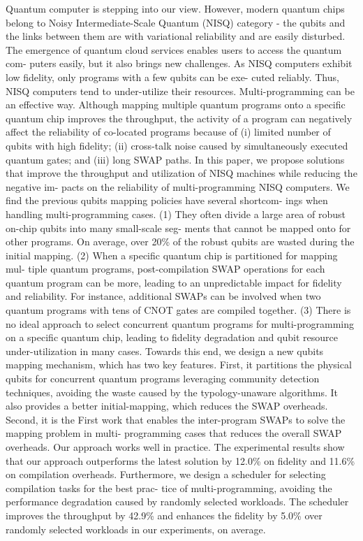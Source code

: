 \documentclass{article}
\begin{document}
	Quantum computer is stepping into our view. However, modern
	quantum chips belong to Noisy Intermediate-Scale Quantum (NISQ)
	category \cite{preskill2018quantum} - the qubits and the links between them are with
	variational reliability and are easily disturbed. The emergence of
	quantum cloud services enables users to access the quantum com-
	puters easily, but it also brings new challenges. As NISQ computers
	exhibit low fidelity, only programs with a few qubits can be exe-
	cuted reliably. Thus, NISQ computers tend to under-utilize their
	resources. Multi-programming can be an effective way. Although
	mapping multiple quantum programs onto a specific quantum chip
	improves the throughput, the activity of a program can negatively
	affect the reliability of co-located programs because of (i) limited
	number of qubits with high fidelity; (ii) cross-talk noise caused by
	simultaneously executed quantum gates; and (iii) long SWAP paths.
	In this paper, we propose solutions that improve the throughput
	and utilization of NISQ machines while reducing the negative im-
	pacts on the reliability of multi-programming NISQ computers. We
	find the previous qubits mapping policies have several shortcom-
	ings when handling multi-programming cases. (1) They often divide a large area of robust on-chip qubits into many small-scale seg-
	ments that cannot be mapped onto for other programs. On average,
	over 20\% of the robust qubits are wasted during the initial mapping.
	(2) When a specific quantum chip is partitioned for mapping mul-
	tiple quantum programs, post-compilation SWAP operations for
	each quantum program can be more, leading to an unpredictable
	impact for fidelity and reliability. For instance, additional SWAPs
	can be involved when two quantum programs with tens of CNOT
	gates are compiled together. (3) There is no ideal approach to select
	concurrent quantum programs for multi-programming on a specific
	quantum chip, leading to fidelity degradation and qubit resource
	under-utilization in many cases.
	Towards this end, we design a new qubits mapping mechanism,
	which has two key features. First, it partitions the physical qubits
	for concurrent quantum programs leveraging community detection
	techniques, avoiding the waste caused by the typology-unaware
	algorithms. It also provides a better initial-mapping, which reduces
	the SWAP overheads. Second, it is the First work that enables
	the inter-program SWAPs to solve the mapping problem in multi-
	programming cases that reduces the overall SWAP overheads. Our
	approach works well in practice. The experimental results show
	that our approach outperforms the latest solution \cite{das2019case} by 12.0\%
	on fidelity and 11.6\% on compilation overheads. Furthermore, we
	design a scheduler for selecting compilation tasks for the best prac-
	tice of multi-programming, avoiding the performance degradation
	caused by randomly selected workloads. The scheduler improves
	the throughput by 42.9\% and enhances the fidelity by 5.0\% over
	randomly selected workloads in our experiments, on average.
	
\end{document}
